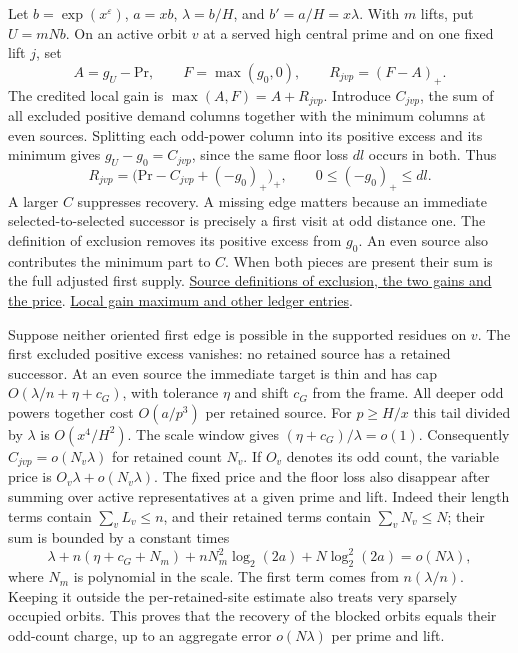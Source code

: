 \documentclass[12pt,letterpaper]{article}
\begin{document}
Let \(b=\exp(x^\varepsilon)\), \(a=xb\), \(\lambda=b/H\), and \(b'=a/H=x\lambda\). With \(m\) lifts, put \(U=mNb\). On an active orbit \(v\) at a served high central prime and on one fixed lift \(j\), set
\[
 A=g_U-\mathrm{Pr},\qquad F=\max(g_0,0),\qquad R_{jvp}=(F-A)_+ .
\]
The credited local gain is \(\max(A,F)=A+R_{jvp}\). Introduce \(C_{jvp}\), the sum of all excluded positive demand columns together with the minimum columns at even sources. Splitting each odd-power column into its positive excess and its minimum gives \(g_U-g_0=C_{jvp}\), since the same floor loss \(dl\) occurs in both. Thus
\[
 R_{jvp}=\bigl(\mathrm{Pr}-C_{jvp}+(-g_0)_+\bigr)_+,
 \qquad 0\le(-g_0)_+\le dl .
\]
A larger \(C\) suppresses recovery. A missing edge matters because an immediate selected-to-selected successor is precisely a first visit at odd distance one. The definition of exclusion removes its positive excess from \(g_0\). An even source also contributes the minimum part to \(C\). When both pieces are present their sum is the full adjusted first supply.
\href{https://github.com/nousentllc/riemann-hypothesis/blob/40e56bab026552e089d7afcfeff08d2defb9c005/src/Formalism/SharpRestriction/GrowthBounds/IsResidueClassZero.lean#L228-L268}{Source definitions of exclusion, the two gains and the price}.
\href{https://github.com/nousentllc/riemann-hypothesis/blob/40e56bab026552e089d7afcfeff08d2defb9c005/src/Formalism/SharpRestriction/GrowthBounds/IsResidueClassZero.lean#L336-L365}{Local gain maximum and other ledger entries}.

Suppose neither oriented first edge is possible in the supported residues on \(v\). The first excluded positive excess vanishes: no retained source has a retained successor. At an even source the immediate target is thin and has cap \(O(\lambda/n+\eta+c_G)\), with tolerance \(\eta\) and shift \(c_G\) from the frame. All deeper odd powers together cost \(O(a/p^3)\) per retained source. For \(p\ge H/x\) this tail divided by \(\lambda\) is \(O(x^4/H^2)\). The scale window gives \((\eta+c_G)/\lambda=o(1)\). Consequently \(C_{jvp}=o(N_v\lambda)\) for retained count \(N_v\). If \(O_v\) denotes its odd count, the variable price is \(O_v\lambda+o(N_v\lambda)\). The fixed price and the floor loss also disappear after summing over active representatives at a given prime and lift. Indeed their length terms contain \(\sum_v L_v\le n\), and their retained terms contain \(\sum_v N_v\le N\); their sum is bounded by a constant times
\[
 \lambda+n(\eta+c_G+N_m)+nN_m^2\log_2(2a)+N\log_2^2(2a)=o(N\lambda),
\]
where \(N_m\) is polynomial in the scale. The first term comes from \(n(\lambda/n)\). Keeping it outside the per-retained-site estimate also treats very sparsely occupied orbits. This proves that the recovery of the blocked orbits equals their odd-count charge, up to an aggregate error \(o(N\lambda)\) per prime and lift.
\end{document}
